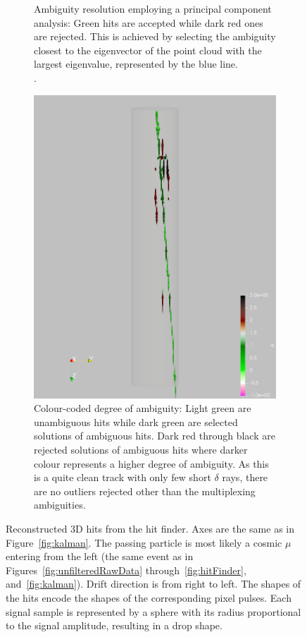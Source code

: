 \documentclass[instruments,article,submit,moreauthors,pdftex]{Definitions/mdpi}
\begin{document}
\begin{figure}[htb]
\begin{subfigure}{\textwidth}
		\caption{Ambiguity resolution employing a principal component analysis:
			Green hits are accepted while dark red ones are rejected.
			This is achieved by selecting the ambiguity closest to the eigenvector of the point cloud with the largest eigenvalue, represented by the blue line.\\.}
		\label{fig:pca_b}
	\end{subfigure}
	\begin{subfigure}{\textwidth}
		\centering
		\includegraphics[viewport=600 0 1000 2000, clip, height=\textwidth, angle=90]{event967_pulses_a_det}
		\caption{Colour-coded degree of ambiguity:
			Light green are unambiguous hits while dark green are selected solutions of ambiguous hits.
			Dark red through black are rejected solutions of ambiguous hits where darker colour represents a higher degree of ambiguity.
			As this is a quite clean track with only few short $\delta$ rays, there are no outliers rejected other than the multiplexing ambiguities.}
		\label{fig:pca_c}
	\end{subfigure}
	\caption{Reconstructed 3D hits from the hit finder.
		Axes are the same as in Figure~\ref{fig:kalman}.
		The passing particle is most likely a cosmic $\mu$ entering from the left (the same event as in Figures~\ref{fig:unfilteredRawData} through~\ref{fig:hitFinder}, and~\ref{fig:kalman}).
		Drift direction is from right to left.
		The shapes of the hits encode the shapes of the corresponding pixel pulses.
		Each signal sample is represented by a sphere with its radius proportional to the signal amplitude, resulting in a drop shape.}
	\label{fig:pca}
\end{figure}
\end{document}
